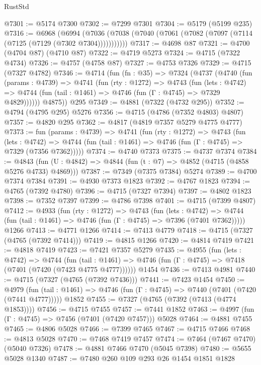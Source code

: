 \begin{lexlean}{RustStd}
\begin{coremodule}
@7301 := @5174 @7300
@7302 := @7299 @7301
@7304 := @5179 (@5199 @235)
@7316 := @6968
    (@6994 (@7036 (@7038 (@7040 (@7061 (@7082 (@7097 (@7114 (@7125 (@7129 (@7302 @7304)))))))))))
@7317 := @4698 @87
@7321 := @4700 (@4704 @87) (@4710 @87)
@7322 := @4719 @5273
@7324 := @4715 (@7322 @4734)
@7326 := @4757 (@4758 @87)
@7327 := @4753 @7326
@7329 := @4715 (@7327 @4782)
@7346 := @4714
    (fun (fn : @35) =>
    @7324
      (@4737
        (@4740
          (fun (params : @4739) =>
          @4741
            (fun (rty : @1272) =>
            @4743
              (fun (lets : @4742) =>
              @4744 (fun (tail : @1461) => @4746 (fun (Γ : @4745) => @7329 @4829))))))
        @4875))
    @295
@7349 := @4881 (@7322 (@4732 @295))
@7352 := @4794 (@4795 @295) @5276
@7356 := @4715 (@4786 (@7352 @4803) @4807)
@7357 := @4820 @295
@7362 := @4817 (@4819 @7357 @5279 @4775 @4777)
@7373 := fun (params : @4739) =>
  @4741
    (fun (rty : @1272) =>
    @4743
      (fun (lets : @4742) =>
      @4744 (fun (tail : @1461) => @4746 (fun (Γ : @4745) => @7329 (@7356 @7362)))))
@7374 := @4740 @7373
@7375 := @4737 @7374
@7384 := @4843 (fun (U : @4842) => @4844 (fun (t : @7) => @4852 (@4715 (@4858 @5276 @4733) @4869)))
@7387 := @7349 (@7375 @7384) @5274
@7389 := @4700 @7374 @7384
@7391 := @4930 @7373 @1823
@7392 := @4767 @1823
@7394 := @4765 (@7392 @4780)
@7396 := @4715 (@7327 @7394)
@7397 := @4802 @1823
@7398 := @7352 @7397
@7399 := @4786 @7398
@7401 := @4715 (@7399 @4807)
@7412 := @4933
    (fun (rty : @1272) =>
    @4743
      (fun (lets : @4742) =>
      @4744 (fun (tail : @1461) => @4746 (fun (Γ : @4745) => @7396 (@7401 @7362)))))
    @1266
@7413 := @4771 @1266
@7414 := @7413 @4779
@7418 := @4715 (@7327 (@4765 (@7392 @7414)))
@7419 := @4815 @1266
@7420 := @4814 @7419
@7421 := @4818 @7419
@7423 := @7421 @7357 @5279
@7435 := @4955
    (fun (lets : @4742) =>
    @4744
      (fun (tail : @1461) => @4746 (fun (Γ : @4745) => @7418 (@7401 (@7420 (@7423 @4775 @4777))))))
    @1454
@7436 := @7413 @4981
@7440 := @4715 (@7327 (@4765 (@7392 @7436)))
@7441 := @7423 @1454
@7450 := @4979
    (fun (tail : @1461) => @4746 (fun (Γ : @4745) => @7440 (@7401 (@7420 (@7441 @4777)))))
    @1852
@7455 := @7327 (@4765 (@7392 (@7413 (@4774 @1853))))
@7456 := @4715 @7455
@7457 := @7441 @1852
@7463 := @4997 (fun (Γ : @4745) => @7456 (@7401 (@7420 @7457))) @5028
@7464 := @4881 @7455
@7465 := @4806 @5028
@7466 := @7399 @7465
@7467 := @4715 @7466
@7468 := @4813 @5028
@7470 := @7468 @7419 @7457
@7474 := @7464 (@7467 @7470) (@5040 @7326)
@7478 := @4881 @7466 @7470 (@5045 @7398)
@7480 := @5655 @5028 @1340
@7487 := @7480 @260 @109 @293 @26 @1454 @1851 @1828

\end{coremodule}
\end{lexlean}
